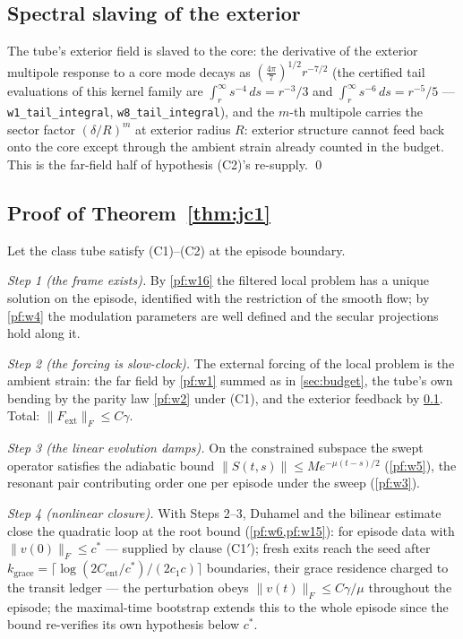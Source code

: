 \documentclass[11pt,letterpaper]{amsart}
\theoremstyle{definition}
\theoremstyle{remark}
\newcommand{\norm}[1]{\lVert #1 \rVert}
\begin{document}
\subsection{Spectral slaving of the exterior}\label{pf:w8}
The tube's exterior field is slaved to the core: the derivative of the exterior
multipole response to a core mode decays as
$(\tfrac{4\pi}{7})^{1/2}r^{-7/2}$ (the certified tail evaluations of this kernel
family are $\int_r^\infty s^{-4}\,ds=r^{-3}/3$ and $\int_r^\infty s^{-6}\,ds=r^{-5}/5$
--- \texttt{w1\_tail\_integral}, \texttt{w8\_tail\_integral}), and the $m$-th multipole carries the sector factor
$(\delta/R)^m$ at exterior radius $R$: exterior structure cannot feed back onto the
core except through the ambient strain already counted in the budget. This is the
far-field half of hypothesis (C2)'s re-supply. \qed

\subsection{Proof of Theorem~\ref{thm:jc1}}\label{pf:jc1}
Let the class tube satisfy (C1)--(C2) at the episode boundary.

\emph{Step 1 (the frame exists).} By \cref{pf:w16} the filtered local problem has a
unique solution on the episode, identified with the restriction of the smooth flow;
by \cref{pf:w4} the modulation parameters are well defined and the secular
projections hold along it.

\emph{Step 2 (the forcing is slow-clock).} The external forcing of the local problem
is the ambient strain: the far field by \cref{pf:w1} summed as in
\cref{sec:budget}, the tube's own bending by the parity law \cref{pf:w2} under (C1),
and the exterior feedback by \cref{pf:w8}. Total: $\norm{F_{\mathrm{ext}}}_F\le
C\gamma$.

\emph{Step 3 (the linear evolution damps).} On the constrained subspace the swept
operator satisfies the adiabatic bound $\norm{S(t,s)}\le Me^{-\mu(t-s)/2}$
(\cref{pf:w5}), the resonant pair contributing order one per episode under the sweep
(\cref{pf:w3}).

\emph{Step 4 (nonlinear closure).} With Steps 2--3, Duhamel and the bilinear estimate
close the quadratic loop at the root bound (\cref{pf:w6,pf:w15}): for episode data
with $\norm{v(0)}_F\le c^*$ --- supplied by clause \textup{(C1$'$)}; fresh exits
reach the seed after $k_{\mathrm{grace}}=\lceil\log(2C_{\mathrm{ent}}/c^*)/(2c_1c)\rceil$
boundaries, their grace residence charged to the transit ledger --- the
perturbation obeys $\norm{v(t)}_F\le C\gamma/\mu$
throughout the episode; the maximal-time bootstrap extends this to the whole episode
since the bound re-verifies its own hypothesis below $c^*$.
\end{document}
